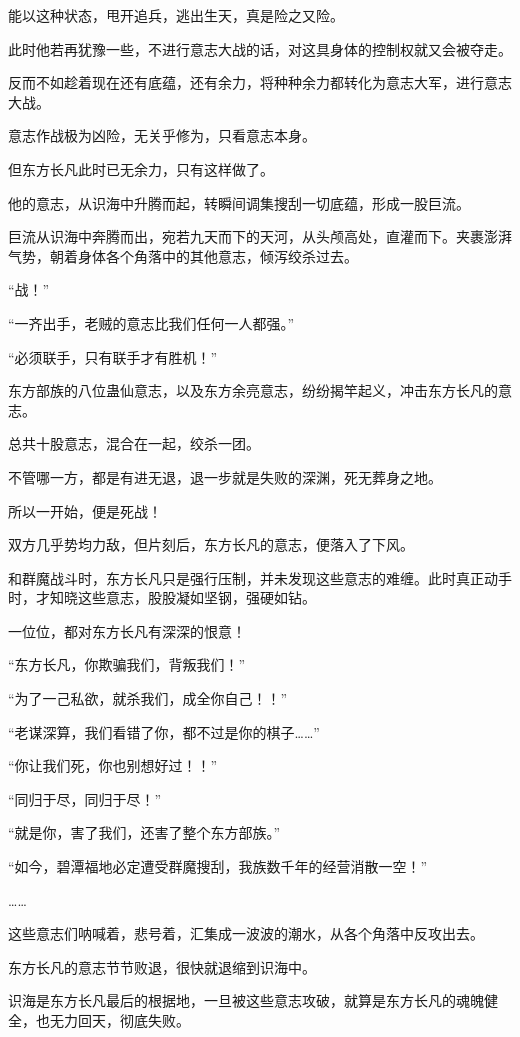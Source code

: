 \begin{this_body}
能以这种状态，甩开追兵，逃出生天，真是险之又险。

此时他若再犹豫一些，不进行意志大战的话，对这具身体的控制权就又会被夺走。

反而不如趁着现在还有底蕴，还有余力，将种种余力都转化为意志大军，进行意志大战。

意志作战极为凶险，无关乎修为，只看意志本身。

但东方长凡此时已无余力，只有这样做了。

他的意志，从识海中升腾而起，转瞬间调集搜刮一切底蕴，形成一股巨流。

巨流从识海中奔腾而出，宛若九天而下的天河，从头颅高处，直灌而下。夹裹澎湃气势，朝着身体各个角落中的其他意志，倾泻绞杀过去。

“战！”

“一齐出手，老贼的意志比我们任何一人都强。”

“必须联手，只有联手才有胜机！”

东方部族的八位蛊仙意志，以及东方余亮意志，纷纷揭竿起义，冲击东方长凡的意志。

总共十股意志，混合在一起，绞杀一团。

不管哪一方，都是有进无退，退一步就是失败的深渊，死无葬身之地。

所以一开始，便是死战！

双方几乎势均力敌，但片刻后，东方长凡的意志，便落入了下风。

和群魔战斗时，东方长凡只是强行压制，并未发现这些意志的难缠。此时真正动手时，才知晓这些意志，股股凝如坚钢，强硬如钻。

一位位，都对东方长凡有深深的恨意！

“东方长凡，你欺骗我们，背叛我们！”

“为了一己私欲，就杀我们，成全你自己！！”

“老谋深算，我们看错了你，都不过是你的棋子……”

“你让我们死，你也别想好过！！”

“同归于尽，同归于尽！”

“就是你，害了我们，还害了整个东方部族。”

“如今，碧潭福地必定遭受群魔搜刮，我族数千年的经营消散一空！”

……

这些意志们呐喊着，悲号着，汇集成一波波的潮水，从各个角落中反攻出去。

东方长凡的意志节节败退，很快就退缩到识海中。

识海是东方长凡最后的根据地，一旦被这些意志攻破，就算是东方长凡的魂魄健全，也无力回天，彻底失败。


\end{this_body}
